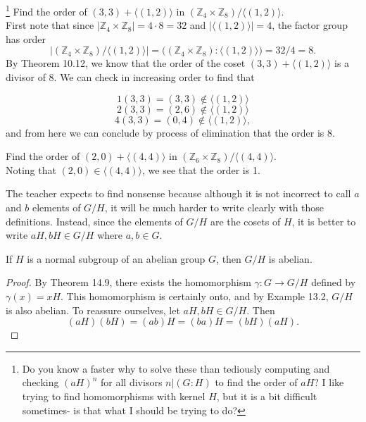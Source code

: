 \documentclass{article}
\newenvironment{problem2}[1]{\noindent {\bf (#1}}
{\medskip}
\newenvironment{problem1}[1]{\noindent {\bf Problem #1:}}
{\medskip}
\begin{document}
\begin{problem1}{14}\footnote{Do you know a faster why to solve these than tediously computing and checking $(aH)^n$ for all divisors $n|(G:H)$ to find the order of $aH$? I like trying to find homomorphisms with kernel $H$, but it is a bit difficult sometimes- is that what I should be trying to do?} Find the order of $(3,3)+\langle (1,2) \rangle$ in $(\mathbb{Z}_4\times\mathbb{Z}_8)/\langle(1,2)\rangle$.\\

First note that since $|\mathbb{Z}_4\times\mathbb{Z}_8|=4\cdot8=32$ and $| \langle(1,2)\rangle|=4$, the factor group has order $$\big|(\mathbb{Z}_4\times\mathbb{Z}_8)/\langle(1,2)\rangle \big|=\big((\mathbb{Z}_4\times\mathbb{Z}_8):\langle(1,2)\rangle\big)=32/4=8.$$ By Theorem 10.12, we know that the order of the coset $(3,3)+\langle (1,2) \rangle$ is a divisor of 8. We can check in increasing order to find that 

$$1(3,3)=(3,3)\notin\langle(1,2)\rangle $$
$$2(3,3)=(2,6)\notin\langle(1,2)\rangle $$
$$4(3,3)=(0,4)\notin\langle(1,2)\rangle, $$
and from here we can conclude by process of elimination that the order is 8.

\end{problem1}


\begin{problem1}{15} Find the order of $(2,0)+\langle (4,4) \rangle$ in $(\mathbb{Z}_6\times\mathbb{Z}_8)/\langle(4,4)\rangle$.\\

Noting that $(2,0) \in \langle(4,4)\rangle$, we see that the order is 1.
\end{problem1}

\begin{problem1}{21(a)} The teacher expects to find nonsense because although it is not incorrect to call $a$ and $b$ elements of $G/H$, it will be much harder to write clearly with those definitions. Instead, since the elements of $G/H$ are the cosets of $H$, it is better to write $aH, bH\in G/H$ where $a,b\in G$.
\end{problem1}



\begin{problem2}{b)} If $H$ is a normal subgroup of an abelian group $G$, then $G/H$ is abelian.
\begin{proof} By Theorem 14.9, there exists the homomorphism $\gamma:G\to G/H$ defined by $\gamma(x)=xH$. This homomorphism is certainly onto, and by Example 13.2, $G/H$ is also abelian. To reassure ourselves, let $aH,bH\in G/H$. Then $$(aH)(bH)=(ab)H=(ba)H=(bH)(aH).$$
\end{proof}
\end{problem2}
\end{document}
